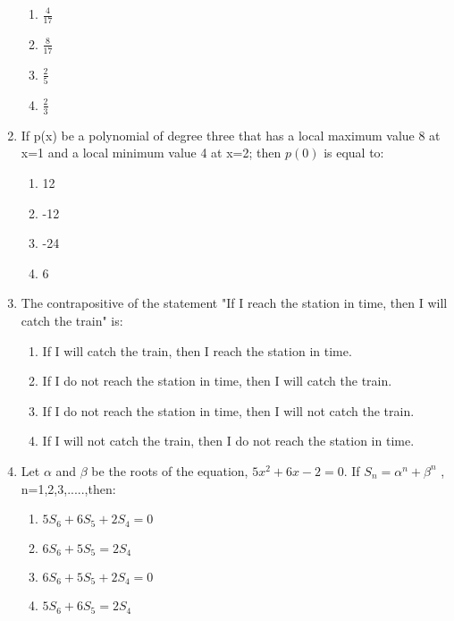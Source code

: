 \documentclass[journal]{IEEEtran}
\numberwithin{equation}{enumi}
\numberwithin{figure}{enumi}
\begin{document}
\begin{enumerate}
    \begin{multicols}{4}
    \begin{enumerate}
        \item $\frac{4}{17}$
        \item $\frac{8}{17}$
        \item $\frac{2}{5}$
        \item $\frac{2}{3}$
    \end{enumerate} 
    \end{multicols}
    \item If p(x) be a polynomial of degree three that has a local maximum value 8 at x=1 and a local minimum value 4 at x=2; then $p(0)$ is equal to: \\
    \begin{multicols}{4}
    \begin{enumerate}
        \item 12
        \item -12
        \item -24
        \item 6
    \end{enumerate} 
    \end{multicols}
    \item The contrapositive of the statement "If I reach the station in time, then I will catch the train" is: \\
    \begin{enumerate}
        \item If I will catch the train, then I reach the station in time.
        \item If I do not reach the station in time, then I will catch the train.
        \item If I do not reach the station in time, then I will not catch the train.
        \item If I will not catch the train, then I do not reach the station in time.
    \end{enumerate} 
    \item Let $\alpha$ and $\beta$ be the roots of the equation, $5x^2+6x-2=0$. If $S_n = \alpha^n + \beta^n$ , n=1,2,3,.....,then: \\
    \begin{multicols}{2}
    \begin{enumerate}
        \item $5S_6+6S_5+2S_4=0$
        \item $6S_6+5S_5=2S_4$
        \item $6S_6+5S_5+2S_4=0$
        \item $5S_6+6S_5=2S_4$

\end{enumerate}
\end{multicols}
\end{enumerate}
\end{document}
